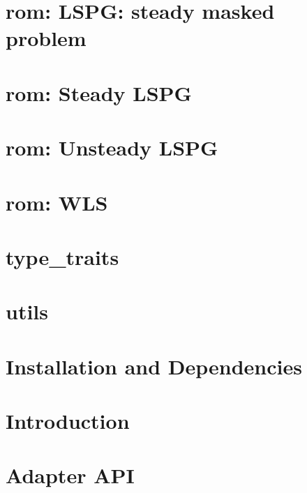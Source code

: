 \let\mypdfximage\pdfximage\def\pdfximage{\immediate\mypdfximage}\documentclass[twoside]{book}
\newcommand{\+}{\discretionary{\mbox{\scriptsize$\hookleftarrow$}}{}{}}
\begin{document}
\chapter{rom\+: LSPG\+: steady masked problem}
\label{md_pages_components_rom_lspg_masked_steady}

\chapter{rom\+: Steady LSPG}
\label{md_pages_components_rom_lspg_steady}

\chapter{rom\+: Unsteady LSPG}
\label{md_pages_components_rom_lspg_unsteady}

\chapter{rom\+: WLS}
\label{md_pages_components_rom_wls}

\chapter{type\+\_\+traits}
\label{md_pages_components_type_traits}

\chapter{utils}
\label{md_pages_components_utils}

\chapter{Installation and Dependencies}
\label{md_pages_installation}

\chapter{Introduction}
\label{md_pages_introduction}

\chapter{Adapter API}
\label{md_pages_revise_and_pick_coreconcepts_adapter_api}

\end{document}
